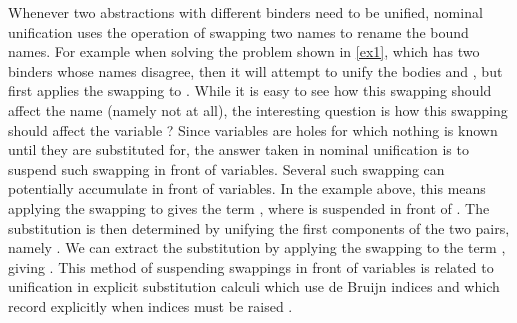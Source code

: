\begin{isabellebody}
\begin{isamarkuptext}
  Whenever two abstractions with different binders need to be unified, nominal
  unification uses the operation of swapping two names to rename the bound
  names. For example when solving the problem shown in \eqref{ex1}, which has
  two binders whose names disagree, then it will attempt to unify the bodies
   and , but first applies the swapping  to . While it is easy to see how this swapping
  should affect the name  (namely not at all), the interesting
  question is how this swapping should affect the variable ? Since
  variables are holes for which nothing is known until they are substituted
  for, the answer taken in nominal unification is to suspend such swapping in
  front of variables. Several such swapping can potentially accumulate in
  front of variables. In the example above, this means applying the swapping
   to  gives the term , where  is suspended in front of . 
  The substitution  is then determined by unifying
  the first components of the two pairs, namely . 
  We can extract the substitution by applying the swapping to the term , giving
  .
  This 
  method of suspending swappings in
  front of variables is related to unification in explicit substitution
  calculi which use de Bruijn indices and which record explicitly when indices must
  be raised \cite{Dowek96}.


\end{isamarkuptext}
\end{isabellebody}
